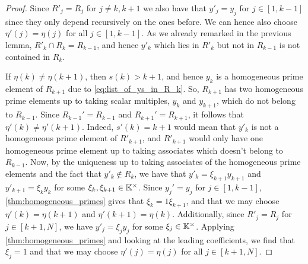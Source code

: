 \begin{proof}
	Since $R'_j = R_j$ for $j\neq k, k+1$ we also have that $y'_j = y_j$ for $j\in [1,
			k-1]$ since they only depend recursively on the ones before. We can hence also choose
	$\eta'(j) = \eta(j)$ for all $j\in [1, k-1]$. As we already remarked in the previous
	lemma, $R'_k \cap R_k = R_{k-1}$, and hence $y'_k$ which lies in $R'_k$ but not in
	$R_{k-1}$ is not contained in $R_k$.

	If $\eta(k) \neq \eta(k+1)$, then $s(k) > k+1$, and hence $y_k$ is a homogeneous prime
	element of $R_{k+1}$ due to \cref{eq:list_of_ys_in_R_k}. So, $R_{k+1}$ has two
	homogeneous prime elements up to taking scalar multiples, $y_k$ and $y_{k+1}$, which do
	not belong to $R_{k-1}$. Since $R_{k-1}' = R_{k-1}$ and $R_{k+1}' = R_{k+1}$, it
	follows that $\eta'(k) \neq \eta'(k+1)$. Indeed, $s'(k) = k+1$ would mean that $y'_k$
	is not a homogeneous prime element of $R'_{k+1}$, and $R'_{k+1}$ would only have one
	homogeneous prime element up to taking associates which doesn't belong to $R_{k-1}$.
	Now, by the uniqueness up to taking associates of the homogeneous prime elements and
	the fact that $y'_k \notin R_k$, we have that $y'_k = \xi_{k+1}y_{k+1}$ and $y'_{k+1} =
		\xi_{k}y_k$ for some $\xi_k, \xi_{k+1} \in \mathbb{K}^\times$. Since $y_j' = y_j$ for $j \in
		[1, k-1]$, \cref{thm:homogeneous_primes} gives that $\xi_{k} = 1 \xi_{k+1}$, and that
	we may choose $\eta'(k) = \eta(k+1)$ and $\eta'(k+1) = \eta(k)$. Additionally, since
	$R'_j = R_j$ for $j \in [k+1, N]$, we have $y'_j = \xi_j y_j$ for some $\xi_j \in
		\mathbb{K}^\times$. Applying \cref{thm:homogeneous_primes} and looking at the leading
	coefficients, we find that $\xi_j = 1$ and that we may choose $\eta'(j) = \eta(j)$ for
	all $j \in [k+1, N]$. \medskip


\end{proof}
